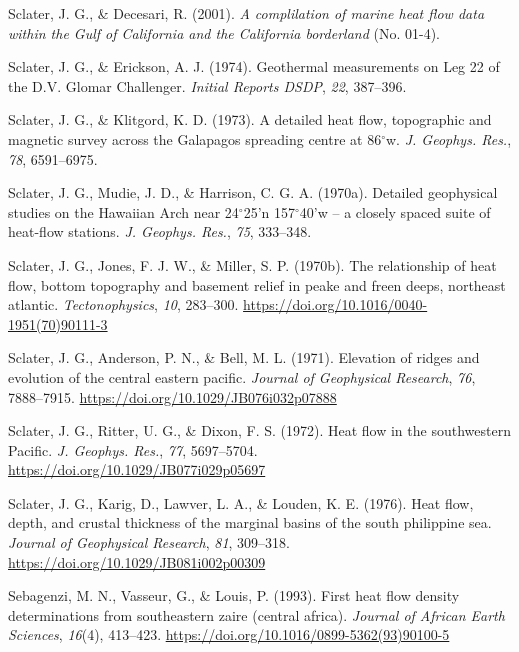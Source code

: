 \begin{CSLReferences}{1}{1}
\leavevmode{}%
Sclater, J. G., \& Decesari, R. (2001). \emph{A complilation of marine heat flow data within the {Gulf of California and the California borderland}} (No. 01-4).

\leavevmode{}%
Sclater, J. G., \& Erickson, A. J. (1974). Geothermal measurements on {Leg} 22 of the {D.V. Glomar Challenger}. \emph{Initial Reports DSDP}, \emph{22}, 387--396.

\leavevmode{}%
Sclater, J. G., \& Klitgord, K. D. (1973). A detailed heat flow, topographic and magnetic survey across the {Galapagos} spreading centre at 86\(^\circ\)w. \emph{J. Geophys. Res.}, \emph{78}, 6591--6975.

\leavevmode{}%
Sclater, J. G., Mudie, J. D., \& Harrison, C. G. A. (1970a). Detailed geophysical studies on the {Hawaiian Arch} near 24\(^\circ\)25'n 157\(^\circ\)40'w -- a closely spaced suite of heat-flow stations. \emph{J. Geophys. Res.}, \emph{75}, 333--348.

\leavevmode{}%
Sclater, J. G., Jones, F. J. W., \& Miller, S. P. (1970b). The relationship of heat flow, bottom topography and basement relief in peake and freen deeps, northeast atlantic. \emph{Tectonophysics}, \emph{10}, 283--300. \url{https://doi.org/10.1016/0040-1951(70)90111-3}

\leavevmode{}%
Sclater, J. G., Anderson, P. N., \& Bell, M. L. (1971). Elevation of ridges and evolution of the central eastern pacific. \emph{Journal of Geophysical Research}, \emph{76}, 7888--7915. \url{https://doi.org/10.1029/JB076i032p07888}

\leavevmode{}%
Sclater, J. G., Ritter, U. G., \& Dixon, F. S. (1972). Heat flow in the southwestern {Pacific}. \emph{J. Geophys. Res.}, \emph{77}, 5697--5704. \url{https://doi.org/10.1029/JB077i029p05697}

\leavevmode{}%
Sclater, J. G., Karig, D., Lawver, L. A., \& Louden, K. E. (1976). Heat flow, depth, and crustal thickness of the marginal basins of the south philippine sea. \emph{Journal of Geophysical Research}, \emph{81}, 309--318. \url{https://doi.org/10.1029/JB081i002p00309}

\leavevmode{}%
Sebagenzi, M. N., Vasseur, G., \& Louis, P. (1993). First heat flow density determinations from southeastern zaire (central africa). \emph{Journal of African Earth Sciences}, \emph{16}(4), 413--423. \url{https://doi.org/10.1016/0899-5362(93)90100-5}


\end{CSLReferences}
